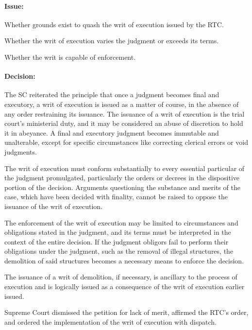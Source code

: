 \documentclass[
12pt,
oneside,
onehalfspacing,
headsepline
]{DigestCollection}
\begin{document}
\paragraph{Issue:}
\label{718c07d0-1254-11ef-aa24-9916ea601717}


Whether grounds exist to quash the writ of execution issued by the RTC.

Whether the writ of execution varies the judgment or exceeds its terms.

Whether the writ is capable of enforcement.

\paragraph{Decision:}
\label{6f61fbe0-1254-11ef-aa24-9916ea601717}


The SC reiterated the principle that once a judgment becomes final and executory, a writ of execution is issued as a matter of course, in the absence of any order restraining its issuance. The issuance of a writ of execution is the trial court's ministerial duty, and it may be considered an abuse of discretion to hold it in abeyance. A final and executory judgment becomes immutable and unalterable, except for specific circumstances like correcting clerical errors or void judgments.

The writ of execution must conform substantially to every essential particular of the judgment promulgated, particularly the orders or decrees in the dispositive portion of the decision. Arguments questioning the substance and merits of the case, which have been decided with finality, cannot be raised to oppose the issuance of the writ of execution.

The enforcement of the writ of execution may be limited to circumstances and obligations stated in the judgment, and its terms must be interpreted in the context of the entire decision. If the judgment obligors fail to perform their obligations under the judgment, such as the removal of illegal structures, the demolition of said structures becomes a necessary means to enforce the decision.

The issuance of a writ of demolition, if necessary, is ancillary to the process of execution and is logically issued as a consequence of the writ of execution earlier issued.

Supreme Court dismissed the petition for lack of merit, affirmed the RTC's order, and ordered the implementation of the writ of execution with dispatch.
\end{document}
